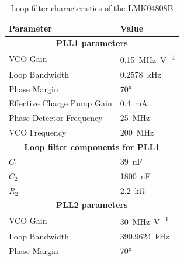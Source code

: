 \begin{table}[tbh]
	\caption[LMK04808B loop filter characteristics]{Loop filter characteristics of the LMK04808B}
	\label{tab:lmk04808B_filter}
	\centering
	\begin{tabularx}{\textwidth}{Xl}
		\toprule
		\textbf{Parameter}                                                        & \textbf{Value}           \\ \midrule
		                            \multicolumn{2}{c}{\textbf{PLL1 parameters}}                             \\
		VCO Gain                                                                  & \SI{0.15}{\MHz\per\volt} \\
		Loop Bandwidth                                                            & \SI{0.2578}{\kHz}        \\
		Phase Margin                                                              & \ang{70}                 \\
		Effective Charge Pump Gain                                                & \SI{0.4}{\milli\ampere}  \\
		Phase Detector Frequency                                                  & \SI{25}{\MHz}            \\
		VCO Frequency                                                             & \SI{200}{\MHz}           \\
		                    \multicolumn{2}{c}{\textbf{Loop filter components for PLL1}}                     \\
		$C_{1}$                                                                   & \SI{39}{\nano\farad}     \\
		$C_{2}$                                                                   & \SI{1800}{\nano\farad}   \\
		$R_{2}$                                                                   & \SI{2.2}{\kilo\ohm}      \\
		[0.3cm]
	    \multicolumn{2}{c}{\textbf{PLL2 parameters}}                   \\
		VCO Gain                                                                  & \SI{30}{\MHz\per\volt}   \\
		Loop Bandwidth                                                            & \SI{390.9624}{\kHz}      \\
		Phase Margin                                                              & \ang{70}                 \\

\end{tabularx}
\end{table}
